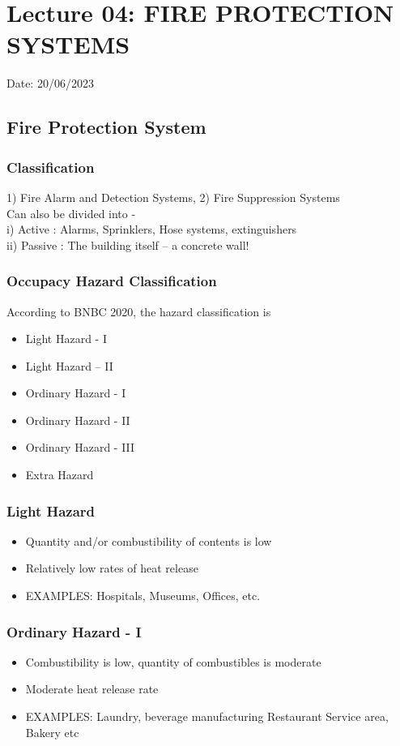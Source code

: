 \documentclass{article}
\begin{document}
\section{Lecture 04: FIRE PROTECTION SYSTEMS} 
\hfill Date: 20/06/2023

\subsection*{Fire Protection System}
\subsubsection*{Classification}
1) Fire Alarm and Detection Systems, 
2) Fire Suppression Systems\\

Can also be divided into - \\
i) Active : Alarms, Sprinklers, Hose systems,
extinguishers\\
ii) Passive : The building itself – a concrete wall!\\

\subsubsection*{Occupacy Hazard Classification}
According to BNBC 2020, the hazard classification is
\begin{itemize}
  \item Light Hazard - I
  \item Light Hazard – II
  \item Ordinary Hazard - I
  \item Ordinary Hazard - II
  \item Ordinary Hazard - III
  \item Extra Hazard
\end{itemize}

\subsubsection*{Light Hazard}
\begin{itemize}
  \item Quantity and/or combustibility of contents is low
  \item Relatively low rates of heat release
  \item EXAMPLES: Hospitals, Museums, Offices, etc.
\end{itemize}

\subsubsection*{Ordinary Hazard - I}
\begin{itemize}
  \item Combustibility is low, quantity of combustibles is moderate
  \item Moderate heat release rate
  \item EXAMPLES: Laundry, beverage manufacturing Restaurant
  Service area, Bakery etc
\end{itemize}
\end{document}
